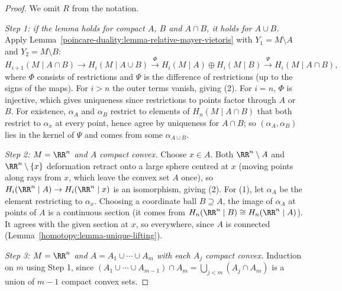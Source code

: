 \begin{proof}
We omit $R$ from the notation.

\emph{Step 1: if the lemma holds for compact $A$, $B$ and $A \cap B$, it holds for $A \cup B$.} Apply Lemma~\ref{poincare-duality:lemma-relative-mayer-vietoris} with
$Y_1 = M \setminus A$ and $Y_2 = M \setminus B$:
\[
H_{i+1}(M \mid A \cap B) \to H_i(M \mid A \cup B) \xrightarrow{\Phi} H_i(M \mid A) \oplus H_i(M \mid B) \xrightarrow{\Psi} H_i(M \mid A \cap B),
\]
where $\Phi$ consists of restrictions and $\Psi$ is the difference of restrictions (up to the signs of the maps). For $i > n$ the outer terms vanish, giving (2). For
$i = n$, $\Phi$ is injective, which gives uniqueness since restrictions to points factor through $A$ or $B$. For existence, $\alpha_A$ and $\alpha_B$ restrict to
elements of $H_n(M \mid A \cap B)$ that both restrict to $\alpha_x$ at every point, hence agree by uniqueness for $A \cap B$; so $(\alpha_A, \alpha_B)$ lies in the
kernel of $\Psi$ and comes from some $\alpha_{A \cup B}$.

\emph{Step 2: $M = \RR^n$ and $A$ compact convex.} Choose $x \in A$. Both $\RR^n \setminus A$ and $\RR^n \setminus \{x\}$ deformation retract onto a large sphere centred at $x$
(moving points along rays from $x$, which leave the convex set $A$ once), so $H_i(\RR^n \mid A) \to H_i(\RR^n \mid x)$ is an isomorphism, giving (2). For (1), let
$\alpha_A$ be the element restricting to $\alpha_x$. Choosing a coordinate ball $B \supseteq A$, the image of $\alpha_A$ at points of $A$ is a continuous section (it
comes from $H_n(\RR^n \mid B) \cong H_n(\RR^n \mid A)$). It agrees with the given section at $x$, so everywhere, since $A$ is connected
(Lemma~\ref{homotopy:lemma-unique-lifting}).

\emph{Step 3: $M = \RR^n$ and $A = A_1 \cup \cdots \cup A_m$ with each $A_j$ compact convex.} Induction on $m$ using Step 1, since
$(A_1 \cup \cdots \cup A_{m-1}) \cap A_m = \bigcup_{j < m}(A_j \cap A_m)$ is a union of $m - 1$ compact convex sets.


\end{proof}
